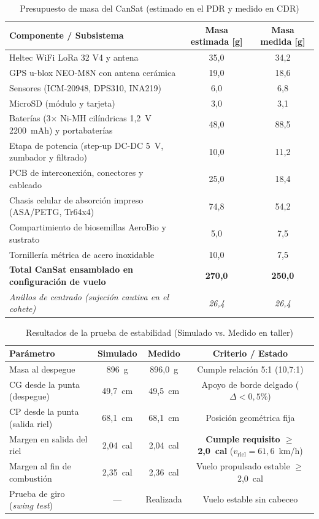 \begin{table}[htbp]
\centering
\caption{Presupuesto de masa del CanSat (estimado en el PDR y medido en CDR)}
\label{tab:masa_cansat}
\begin{tabular}{lcc}
\hline
\textbf{Componente / Subsistema} & \textbf{Masa estimada [g]} & \textbf{Masa medida [g]} \\ \hline
Heltec WiFi LoRa 32 V4 y antena & 35,0 & 34,2 \\
GPS u-blox NEO-M8N con antena cerámica & 19,0 & 18,6 \\
Sensores (ICM-20948, DPS310, INA219) & 6,0 & 6,8 \\
MicroSD (módulo y tarjeta) & 3,0 & 3,1 \\
Baterías (3$\times$ Ni-MH cilíndricas 1,2~V 2200~mAh) y portabaterías & 48,0 & 88,5 \\
Etapa de potencia (step-up DC-DC 5~V, zumbador y filtrado) & 10,0 & 11,2 \\
PCB de interconexión, conectores y cableado & 25,0 & 18,4 \\
Chasis celular de absorción impreso (ASA/PETG, Tr64x4) & 74,8 & 54,2 \\
Compartimiento de biosemillas AeroBio y sustrato & 5,0 & 7,5 \\
Tornillería métrica de acero inoxidable & 10,0 & 7,5 \\ \hline
\textbf{Total CanSat ensamblado en configuración de vuelo} & \textbf{270,0} & \textbf{250,0} \\ \hline
\textit{Anillos de centrado (sujeción cautiva en el cohete)} & \textit{26,4} & \textit{26,4} \\ \hline
\end{tabular}
\end{table}


\begin{table}[htbp]
\centering
\caption{Resultados de la prueba de estabilidad (Simulado vs. Medido en taller)}
\label{tab:prueba_estabilidad}
\begin{tabular}{lccc}
\hline
\textbf{Parámetro} & \textbf{Simulado} & \textbf{Medido} & \textbf{Criterio / Estado} \\ \hline
Masa al despegue & 896~g & 896,0~g & Cumple relación 5:1 (10,7:1) \\
CG desde la punta (despegue) & 49,7~cm & 49,5~cm & Apoyo de borde delgado ($\Delta < 0,5\%$) \\
CP desde la punta (salida riel) & 68,1~cm & 68,1~cm & Posición geométrica fija \\
Margen en salida del riel & 2,04~cal & 2,04~cal & \textbf{Cumple requisito $\ge$ 2,0~cal} ($v_{\text{riel}} = 61,6$~km/h) \\
Margen al fin de combustión & 2,35~cal & 2,36~cal & Vuelo propulsado estable $\ge$ 2,0~cal \\
Prueba de giro (\textit{swing test}) & --- & Realizada & Vuelo estable sin cabeceo \\ \hline
\end{tabular}
\end{table}


